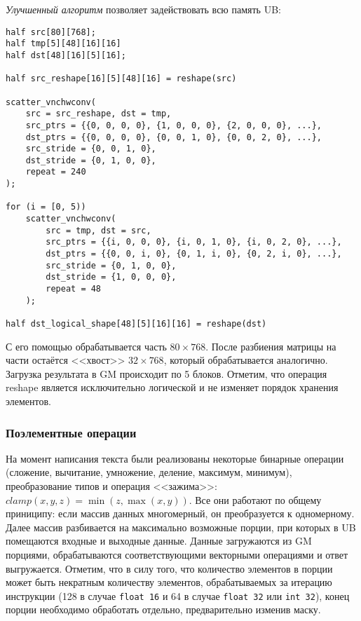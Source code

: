 \textit{Улучшенный алгоритм} позволяет задействовать всю память UB:

\begin{lstlisting}
half src[80][768];
half tmp[5][48][16][16]
half dst[48][16][5][16];

half src_reshape[16][5][48][16] = reshape(src)

scatter_vnchwconv(
    src = src_reshape, dst = tmp,
    src_ptrs = {{0, 0, 0, 0}, {1, 0, 0, 0}, {2, 0, 0, 0}, ...},
    dst_ptrs = {{0, 0, 0, 0}, {0, 0, 1, 0}, {0, 0, 2, 0}, ...},
    src_stride = {0, 0, 1, 0},
    dst_stride = {0, 1, 0, 0},
    repeat = 240
);

for (i = [0, 5))
    scatter_vnchwconv(
        src = tmp, dst = src,
        src_ptrs = {{i, 0, 0, 0}, {i, 0, 1, 0}, {i, 0, 2, 0}, ...},
        dst_ptrs = {{0, 0, i, 0}, {0, 1, i, 0}, {0, 2, i, 0}, ...},
        src_stride = {0, 1, 0, 0},
        dst_stride = {1, 0, 0, 0},
        repeat = 48
    );

half dst_logical_shape[48][5][16][16] = reshape(dst)
\end{lstlisting}

С его помощью обрабатывается часть $80 \times 768$. После разбиения матрицы
на части остаётся <<хвост>> $32 \times 768$, который обрабатывается аналогично.
Загрузка результата в GM происходит по 5 блоков. Отметим, что операция reshape
является исключительно логической и не изменяет порядок хранения элементов.

\subsubsection{Поэлементные операции}

На момент написания текста были реализованы некоторые бинарные операции
(сложение, вычитание, умножение, деление, максимум, минимум), преобразование
типов и операция <<зажима>>: $clamp(x, y, z) = \min(z, \max(x, y))$. Все они
работают по общему приниципу: если массив данных многомерный, он преобразуется
к одномерному. Далее массив разбивается на максимально возможные порции,
при которых в UB помещаются входные и выходные данные. Данные загружаются из
GM порциями, обрабатываются соответствующими векторными операциями и ответ
выгружается. Отметим, что в силу того, что количество элементов в порции
может быть некратным количеству элементов, обрабатываемых за итерацию инструкции
(128 в случае \texttt{float 16} и 64 в случае \texttt{float 32} или
\texttt{int 32}), конец порции необходимо обработать отдельно, предварительно
изменив маску.

